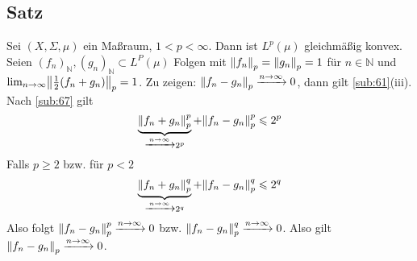 \subsection[Satz: Für $1 <p <\infty$ ist $L^p(\mu)$ gleichmäßig konvex]{Satz} %
\label{sub:68}
Sei $(X,\Sigma,\mu)$ ein Maßraum, $1 <p < \infty$. Dann ist $L^p(\mu)$ gleichmäßig konvex.
Seien $(f_n)_\mathds{N}, (g_n)_\mathds{N} \subset L^P(\mu)$ Folgen mit $\norm[p]{f_n}= \norm[p]{g_n}= 1 $ für $n \in \mathds{N}$ und 
$\lim_{ n \to \infty} \norm[p]{\frac{1}{2} (f_n+g_n)}=1$. Zu zeigen: $\norm[p]{f_n-g_n} \xrightarrow{n \to \infty} 0$, dann gilt \ref{sub:61}(iii). Nach \ref{sub:67}
gilt 
\[
	\underbrace{\norm[p]{f_n+g_n}^p}_{\xrightarrow{n \to \infty} 2^p} + \norm[p]{f_n-g_n}^p \le 2^{p} 
\]
Falls $p\ge 2$ bzw. für $p < 2$
\[
	\underbrace{\norm[p]{f_n+g_n}^q }_{\xrightarrow{n \to \infty} 2^q}+ \norm[p]{f_n-g_n}^q \le 2^q
\]
Also folgt $\norm[p]{f_n -g_n}^p \xrightarrow{n \to \infty} 0$ bzw. $\norm[p]{f_n-g_n}^q \xrightarrow{n \to \infty} 0$. Also gilt 
$\norm[p]{f_n -g_n} \xrightarrow{n \to \infty} 0$. \bewende

